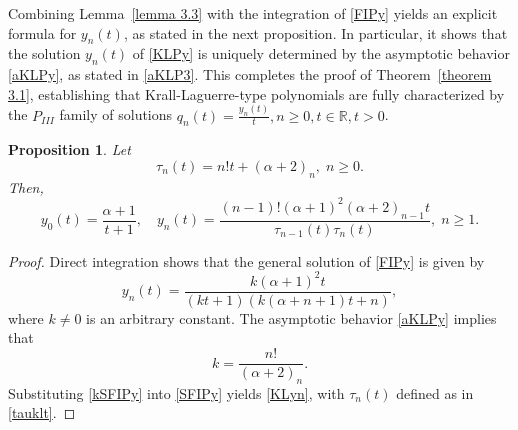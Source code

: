 \documentclass[10pt, reqno]{amsart}
\numberwithin{equation}{section}
\newtheorem{proposition}{Proposition}[section]
\numberwithin{equation}{section}
\begin{document}
Combining Lemma~\ref{lemma 3.3} with the integration of \eqref{FIPy} yields an explicit formula for $y_n(t)$, as stated in the next proposition. In particular, it shows that the solution $y_n(t)$ of \eqref{KLPy} is uniquely determined by the asymptotic behavior \eqref{aKLPy}, as stated in \eqref{aKLP3}. This completes the proof of Theorem~\ref{theorem 3.1}, establishing that Krall-Laguerre-type polynomials are fully characterized by the $P_{III}$ family of solutions $q_{n}(t)=\frac{y_n(t)}{t}, n\geq 0, t\in\mathbb{R}, t>0$.
\begin{proposition} \label{proposition 3.2}
Let
\begin{equation}
\tau_n(t)=n! t+(\alpha+2)_n,\; n\geq 0. \label{tauklt}
\end{equation}
Then,
\begin{equation}
y_0(t)=\frac{\alpha+1}{t+1},\quad y_n(t)=\frac{(n-1)!(\alpha+1)^2(\alpha+2)_{n-1}t}{\tau_{n-1}(t)\tau_n(t)}, \;n\geq 1.\label{KLyn}
\end{equation}
\end{proposition}
\begin{proof}
Direct integration shows that the general solution of \eqref{FIPy} is given by
\begin{equation}
y_n(t)=\frac{k(\alpha+1)^2t}{(kt+1)(k(\alpha+n+1)t+n)}, \label{SFIPy}
\end{equation}
where $k\neq 0$ is an arbitrary constant. The asymptotic behavior \eqref{aKLPy} implies that 
\begin{equation}
k=\frac{n!}{(\alpha+2)_n}. \label{kSFIPy}
\end{equation}
Substituting \eqref{kSFIPy} into \eqref{SFIPy} yields \eqref{KLyn}, with $\tau_n(t)$ defined as in \eqref{tauklt}.
\end{proof}
\end{document}
